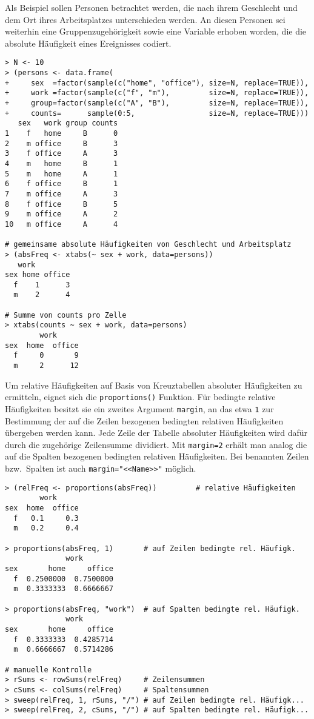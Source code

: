 Als Beispiel sollen Personen betrachtet werden, die nach ihrem Geschlecht und dem Ort ihres Arbeitsplatzes unterschieden werden. An diesen Personen sei weiterhin eine Gruppenzugehörigkeit sowie eine Variable erhoben worden, die die absolute Häufigkeit eines Ereignisses codiert.
\begin{lstlisting}
> N <- 10
> (persons <- data.frame(
+     sex  =factor(sample(c("home", "office"), size=N, replace=TRUE)),
+     work =factor(sample(c("f", "m"),         size=N, replace=TRUE)),
+     group=factor(sample(c("A", "B"),         size=N, replace=TRUE)),
+     counts=      sample(0:5,                 size=N, replace=TRUE)))
   sex   work group counts
1    f   home     B      0
2    m office     B      3
3    f office     A      3
4    m   home     B      1
5    m   home     A      1
6    f office     B      1
7    m office     A      3
8    f office     B      5
9    m office     A      2
10   m office     A      4

# gemeinsame absolute Häufigkeiten von Geschlecht und Arbeitsplatz
> (absFreq <- xtabs(~ sex + work, data=persons))
   work
sex home office
  f    1      3
  m    2      4

# Summe von counts pro Zelle
> xtabs(counts ~ sex + work, data=persons)
        work
sex  home  office
  f     0       9
  m     2      12
\end{lstlisting}

Um relative Häufigkeiten auf Basis von Kreuztabellen absoluter Häufigkeiten zu ermitteln, eignet sich die \lstinline!proportions()! Funktion. Für bedingte relative Häufigkeiten besitzt sie ein zweites Argument \lstinline!margin!, an das etwa \lstinline!1! zur Bestimmung der auf die Zeilen bezogenen bedingten relativen Häufigkeiten übergeben werden kann. Jede Zeile der Tabelle absoluter Häufigkeiten wird dafür durch die zugehörige Zeilensumme dividiert. Mit \lstinline!margin=2! erhält man analog die auf die Spalten bezogenen bedingten relativen Häufigkeiten. Bei benannten Zeilen bzw.\ Spalten ist auch \lstinline!margin="<<Name>>"! möglich.
\begin{lstlisting}
> (relFreq <- proportions(absFreq))         # relative Häufigkeiten
        work
sex  home  office
  f   0.1     0.3
  m   0.2     0.4

> proportions(absFreq, 1)       # auf Zeilen bedingte rel. Häufigk.
              work
sex       home     office
  f  0.2500000  0.7500000
  m  0.3333333  0.6666667

> proportions(absFreq, "work")  # auf Spalten bedingte rel. Häufigk.
              work
sex       home     office
  f  0.3333333  0.4285714
  m  0.6666667  0.5714286

# manuelle Kontrolle
> rSums <- rowSums(relFreq)     # Zeilensummen
> cSums <- colSums(relFreq)     # Spaltensummen
> sweep(relFreq, 1, rSums, "/") # auf Zeilen bedingte rel. Häufigk...
> sweep(relFreq, 2, cSums, "/") # auf Spalten bedingte rel. Häufigk...
\end{lstlisting}

